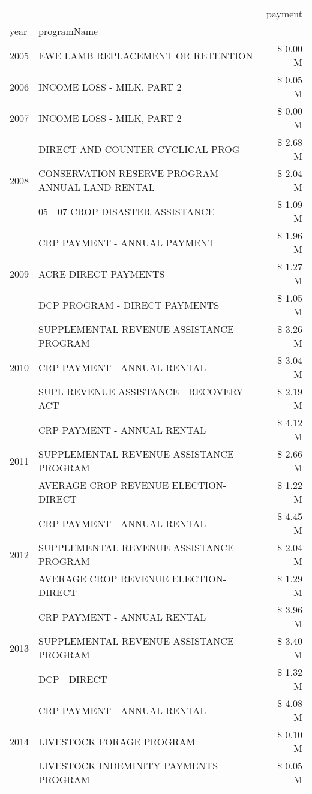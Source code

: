 \begin{tabular}{llr}
\toprule
 &  & payment \\
year & programName &  \\
\midrule
2005 & EWE LAMB REPLACEMENT OR RETENTION & \$ 0.00 M \\
\cline{1-3}
2006 & INCOME LOSS - MILK, PART 2 & \$ 0.05 M \\
\cline{1-3}
2007 & INCOME LOSS - MILK, PART 2 & \$ 0.00 M \\
\cline{1-3}
\multirow[t]{3}{*}{2008} & DIRECT AND COUNTER CYCLICAL PROG & \$ 2.68 M \\
 & CONSERVATION RESERVE PROGRAM - ANNUAL LAND RENTAL & \$ 2.04 M \\
 & 05 - 07 CROP DISASTER ASSISTANCE & \$ 1.09 M \\
\cline{1-3}
\multirow[t]{3}{*}{2009} & CRP PAYMENT - ANNUAL PAYMENT & \$ 1.96 M \\
 & ACRE DIRECT PAYMENTS & \$ 1.27 M \\
 & DCP PROGRAM - DIRECT PAYMENTS & \$ 1.05 M \\
\cline{1-3}
\multirow[t]{3}{*}{2010} & SUPPLEMENTAL REVENUE ASSISTANCE PROGRAM & \$ 3.26 M \\
 & CRP PAYMENT - ANNUAL RENTAL & \$ 3.04 M \\
 & SUPL REVENUE ASSISTANCE - RECOVERY ACT & \$ 2.19 M \\
\cline{1-3}
\multirow[t]{3}{*}{2011} & CRP PAYMENT - ANNUAL RENTAL & \$ 4.12 M \\
 & SUPPLEMENTAL REVENUE ASSISTANCE PROGRAM & \$ 2.66 M \\
 & AVERAGE CROP REVENUE ELECTION-DIRECT & \$ 1.22 M \\
\cline{1-3}
\multirow[t]{3}{*}{2012} & CRP PAYMENT - ANNUAL RENTAL & \$ 4.45 M \\
 & SUPPLEMENTAL REVENUE ASSISTANCE PROGRAM & \$ 2.04 M \\
 & AVERAGE CROP REVENUE ELECTION-DIRECT & \$ 1.29 M \\
\cline{1-3}
\multirow[t]{3}{*}{2013} & CRP PAYMENT - ANNUAL RENTAL & \$ 3.96 M \\
 & SUPPLEMENTAL REVENUE ASSISTANCE PROGRAM & \$ 3.40 M \\
 & DCP - DIRECT & \$ 1.32 M \\
\cline{1-3}
\multirow[t]{3}{*}{2014} & CRP PAYMENT - ANNUAL RENTAL & \$ 4.08 M \\
 & LIVESTOCK FORAGE PROGRAM & \$ 0.10 M \\
 & LIVESTOCK INDEMINITY PAYMENTS PROGRAM & \$ 0.05 M \\

\end{tabular}
